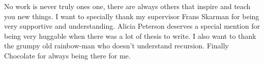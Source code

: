 No work is never truly ones one, there are always others that inspire and teach you new things. I want to specially thank my supervisor Frans Skarman for being very supportive and understanding. Alicia Peterson deserves a special mention for being very huggable when there was a lot of thesis to write. I also want to thank the grumpy old rainbow-man who doesn't understand recursion. Finally Chocolate for always being there for me.
